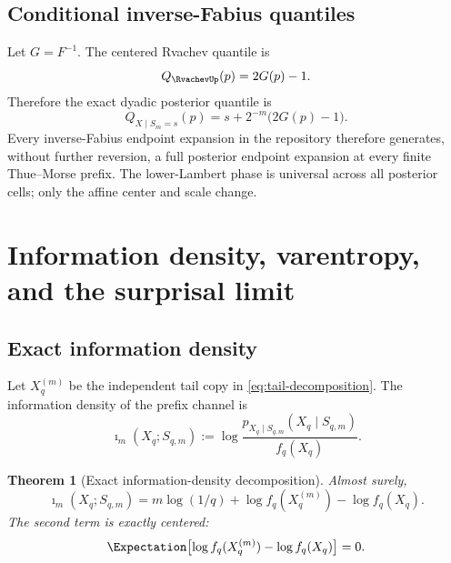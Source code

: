 \documentclass[11pt,oneside]{article}
\newtheorem{theorem}{Theorem}[section]
\theoremstyle{definition}
\theoremstyle{remark}
\begin{document}
\subsection{Conditional inverse-Fabius quantiles}

Let $G=F^{-1}$.  The centered Rvachev quantile is
\begin{equation}
 Q_{\RvachevUp}(p)=2G(p)-1.
 \label{eq:up-quantile}
\end{equation}
Therefore the exact dyadic posterior quantile is
\begin{equation}
 Q_{X\mid S_m=s}(p)
 =s+2^{-m}\bigl(2G(p)-1\bigr).
 \label{eq:posterior-G}
\end{equation}
Every inverse-Fabius endpoint expansion in the repository therefore generates,
without further reversion, a full posterior endpoint expansion at every finite
Thue--Morse prefix.  The lower-Lambert phase is universal across all posterior
cells; only the affine center and scale change.

\section{Information density, varentropy, and the surprisal limit}
\label{sec:information-spectrum}

\subsection{Exact information density}

Let $X_q^{(m)}$ be the independent tail copy in
\eqref{eq:tail-decomposition}.  The information density of the prefix channel is
\begin{equation}
 \imath_m(X_q;S_{q,m})
 :=\log\frac{p_{X_q\mid S_{q,m}}(X_q\mid S_{q,m})}{f_q(X_q)}.
 \label{eq:info-density-def}
\end{equation}

\begin{theorem}[Exact information-density decomposition]
\label{thm:info-density}
Almost surely,
\begin{equation}
 \boxed{
 \imath_m(X_q;S_{q,m})
 =m\log(1/q)+\log f_q(X_q^{(m)})-\log f_q(X_q).}
 \label{eq:info-density}
\end{equation}
The second term is exactly centered:
\begin{equation}
 \Expectation\bigl[\log f_q(X_q^{(m)})-\log f_q(X_q)\bigr]=0.
 \label{eq:centered-exact}
\end{equation}
\end{theorem}
\end{document}
